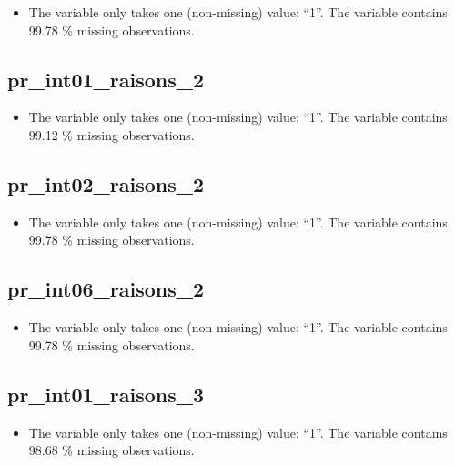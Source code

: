 \documentclass[
  letterpaper,
  DIV=11,
  numbers=noendperiod]{scrartcl}
\providecommand{\tightlist}{%
  \setlength{\itemsep}{0pt}\setlength{\parskip}{0pt}}
\begin{document}
\begin{itemize}
\tightlist
\item
  The variable only takes one (non-missing) value: ``1''. The variable
  contains 99.78 \% missing observations.
\end{itemize}

\fullline

\subsection{pr\_int01\_raisons\_2}\label{pr_int01_raisons_2}

\begin{itemize}
\tightlist
\item
  The variable only takes one (non-missing) value: ``1''. The variable
  contains 99.12 \% missing observations.
\end{itemize}

\fullline

\subsection{pr\_int02\_raisons\_2}\label{pr_int02_raisons_2}

\begin{itemize}
\tightlist
\item
  The variable only takes one (non-missing) value: ``1''. The variable
  contains 99.78 \% missing observations.
\end{itemize}

\fullline

\subsection{pr\_int06\_raisons\_2}\label{pr_int06_raisons_2}

\begin{itemize}
\tightlist
\item
  The variable only takes one (non-missing) value: ``1''. The variable
  contains 99.78 \% missing observations.
\end{itemize}

\fullline

\subsection{pr\_int01\_raisons\_3}\label{pr_int01_raisons_3}

\begin{itemize}
\tightlist
\item
  The variable only takes one (non-missing) value: ``1''. The variable
  contains 98.68 \% missing observations.
\end{itemize}
\end{document}
